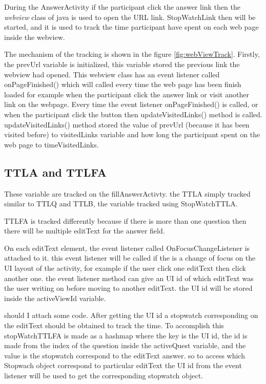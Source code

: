 During the AnswerActivity if the participant click the answer link then the \textit{webview} class of java is used to open the URL link. StopWatchLink then will be started, and it is used to track the time participant have spent on each web page inside the webview.

The mechanism of the tracking is shown in the figure \ref{fig:webViewTrack}. Firstly, the prevUrl variable is initialized, this variable stored the previous link the webview had opened. This webview class has an event listener called onPageFinished() which will called every time the web page has been finish loaded for example when the participant click the answer link or visit another link on the webpage. Every time the event listener onPageFinished() is called, or when the participant click the button then updateVisitedLinks() method is called. updateVisitedLinks() method stored the value of prevUrl (because it has been visited before) to visitedLinks variable and how long the participant spent on the web page to timeVisitedLinks.

\subsection{TTLA and TTLFA}
These variable are tracked on the fillAnswerActivty. the TTLA simply tracked similar to TTLQ and TTLB, the variable tracked using StopWatchTTLA.

TTLFA is tracked differently because if there is more than one question then there will be multiple editText for the answer field.

On each editText element, the event listener called OnFocusChangeListener is attached to it. this event listener will be called if the is a change of focus on the UI layout of the activity, for example if the user click one editText then click another one. the event listener method can give an UI id of which editText was the user writing on before moving to another editText. the UI id will be stored inside the activeViewId variable.

{should I attach some code}. After getting the UI id a stopwatch corresponding on the editText should be obtained to track the time.
To accomplish this stopWatchTTLFA is made as a hashmap where the key is the UI id, the id is made from the index of the question inside the activeQuest variable, and the value is the stopwatch correspond to the editText answer. so to access which Stopwach object correspond to particular editText the UI id from the event listener will be used to get the corresponding stopwatch object.

